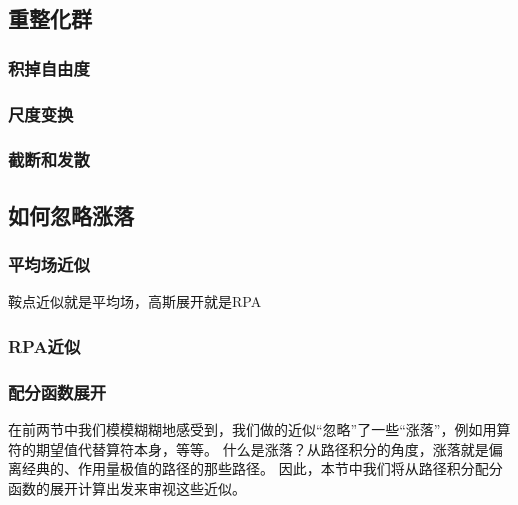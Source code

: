 \documentclass[UTF8, a4paper]{ctexart}
\begin{document}
\subsection{重整化群}

\subsubsection{积掉自由度}

\subsubsection{尺度变换}

\subsubsection{截断和发散}

\subsection{如何忽略涨落}

\subsubsection{平均场近似}

鞍点近似就是平均场，高斯展开就是RPA

\subsubsection{RPA近似}

\subsubsection{配分函数展开}

在前两节中我们模模糊糊地感受到，我们做的近似“忽略”了一些“涨落”，例如用算符的期望值代替算符本身，等等。
什么是涨落？从路径积分的角度，涨落就是偏离经典的、作用量极值的路径的那些路径。
因此，本节中我们将从路径积分配分函数的展开计算出发来审视这些近似。
\end{document}
